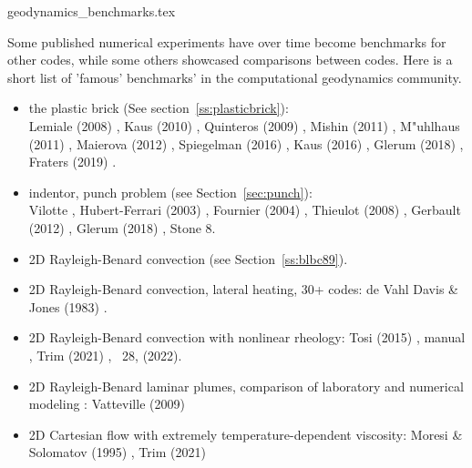 
\begin{flushright} {\tiny {\color{gray} geodynamics\_benchmarks.tex}} \end{flushright}

Some published numerical experiments have over time become benchmarks for other codes, while some 
others showcased comparisons between codes. Here is a short list of 'famous' benchmarks' in the 
computational geodynamics community.

\begin{itemize}

\item the plastic brick (See section~\ref{ss:plasticbrick}): \\
      Lemiale \etal (2008) \cite{lemm08}, 
      Kaus (2010) \cite{kaus10}, 
      Quinteros \etal (2009) \cite{qurj09}, 
      Mishin (2011) \cite{mishin11}, 
      M{"u}hlhaus \etal (2011) \cite{muso11}, 
      Maierova (2012) \cite{maie12}, 
      Spiegelman \etal (2016) \cite{spmw16}, 
      Kaus \etal (2016) \cite{kapb16}, 
      Glerum \etal (2018) \cite{gltf18}, 
      Fraters \etal (2019) \cite{frbt19}.

\item indentor, punch problem (see Section~\ref{sec:punch}):\\
      Vilotte \etal \cite{vidm82,vidm84,vimd86},
      Hubert-Ferrari \etal (2003) \cite{hukm03}, 
      Fournier \etal (2004) \cite{fojd04}, 
      Thieulot \etal (2008) \cite{thfb08},
      Gerbault (2012) \cite{gerb12}, 
      Glerum \etal (2018) \cite{gltf18},
      Stone 8.

\item 2D Rayleigh-Benard convection (see Section~\ref{ss:blbc89}).


\item 2D Rayleigh-Benard convection, lateral heating, 30+ codes: 
      de Vahl Davis \& Jones (1983) \cite{dejo83}.
\item 2D Rayleigh-Benard convection with nonlinear rheology:  
      Tosi \etal (2015) \cite{tosn15}, \aspect{} manual \cite{aspectmanual}, 
      Trim \etal (2021) \cite{trbs21}, \stone~28, \textcite{dakg22} (2022).
\item 2D Rayleigh-Benard laminar plumes, comparison of laboratory and numerical modeling : 
      Vatteville \etal (2009) \cite{vavl09}
\item 2D Cartesian flow with extremely temperature-dependent viscosity:
      Moresi \& Solomatov (1995) \cite{moso95}, Trim \etal (2021) \cite{trbs21}


\end{itemize}
